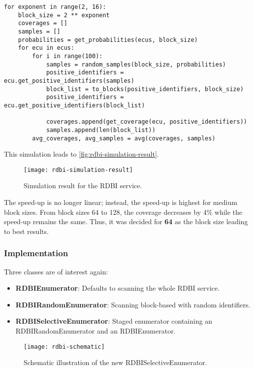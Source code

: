 \begin{samepage}
\begin{verbatim}
for exponent in range(2, 16):
    block_size = 2 ** exponent
    coverages = []
    samples = []
    probabilities = get_probabilities(ecus, block_size)
    for ecu in ecus:
        for i in range(100):
            samples = random_samples(block_size, probabilities)
            positive_identifiers = ecu.get_positive_identifiers(samples)
            block_list = to_blocks(positive_identifiers, block_size)
            positive_identifiers = ecu.get_positive_identifiers(block_list)

            coverages.append(get_coverage(ecu, positive_identifiers))
            samples.append(len(block_list))
        avg_coverages, avg_samples = avg(coverages, samples)
\end{verbatim}
\end{samepage}

This simulation leads to \autoref{fig:rdbi-simulation-result}.

\begin{figure}[h]
    \centering
    \texttt{[image: rdbi-simulation-result]}
    \caption{Simulation result for the RDBI service.}
    \label{fig:rdbi-simulation-result}
\end{figure}

The speed-up is no longer linear; instead, the speed-up is highest for medium block sizes. From block sizes 64 to 128, the coverage decreases by 4\% while the speed-up remains the same. Thus, it was decided for \textbf{64} as the block size leading to best results.

\subsubsection{Implementation}

Three classes are of interest again:

\begin{itemize}
    \item \textbf{RDBIEnumerator}: Defaults to scanning the whole RDBI service.
    \item \textbf{RDBIRandomEnumerator}: Scanning block-based with random identifiers.
    \item \textbf{RDBISelectiveEnumerator}: Staged enumerator containing an RDBIRandomEnumerator and an RDBIEnumerator.
\end{itemize}

\begin{figure}[h]
    \centering
    \texttt{[image: rdbi-schematic]}
    \caption{Schematic illustration of the new RDBISelectiveEnumerator.}
    \label{fig:rdbi-schematic}
\end{figure}


